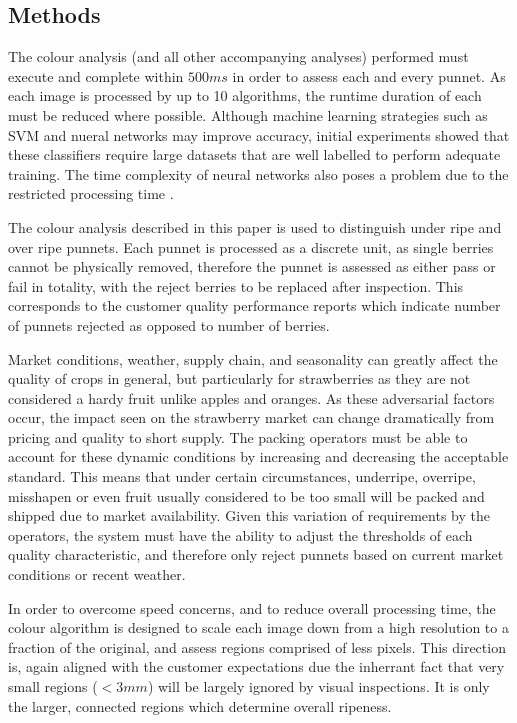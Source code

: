 \documentclass[fleqn,twoside]{article}
\begin{document}
\subsection{Methods}
\label{sec:colour_analysis}

The colour analysis (and all other accompanying analyses) performed must execute and complete within $500ms$ in order to assess each and every punnet. As each image is processed by up to 10 algorithms, the runtime duration of each must be reduced where possible. Although machine learning strategies such as SVM and nueral networks may improve accuracy, initial experiments showed that these classifiers require large datasets that are well labelled to perform adequate training. The time complexity of neural networks also poses a problem due to the restricted processing time \cite{he, angiulli}. 

The colour analysis described in this paper is used to distinguish under ripe and over ripe punnets. Each punnet is processed as a discrete unit, as single berries cannot be physically removed, therefore the punnet is assessed as either pass or fail in totality, with the reject berries to be replaced after inspection. This corresponds to the customer quality performance reports which indicate number of punnets rejected as opposed to number of berries. 

Market conditions, weather, supply chain, and seasonality can greatly affect the quality of crops in general, but particularly for strawberries as they are not considered a hardy fruit unlike apples and oranges. As these adversarial factors occur, the impact seen on the strawberry market can change dramatically from pricing and quality to short supply. The packing operators must be able to account for these dynamic conditions by increasing and decreasing the acceptable standard. This means that under certain circumstances, underripe, overripe, misshapen or even fruit usually considered to be too small will be packed and shipped due to market availability. Given this variation of requirements by the operators, the system must have the ability to adjust the thresholds of each quality characteristic, and therefore only reject punnets based on current market conditions or recent weather. 

In order to overcome speed concerns, and to reduce overall processing time, the colour algorithm is designed to scale each image down from a high resolution to a fraction of the original, and assess regions comprised of less pixels. This direction is, again aligned with the customer expectations due the inherrant fact that very small regions ($<3mm$) will be largely ignored by visual inspections. It is only the larger, connected regions which determine overall ripeness.
\end{document}
